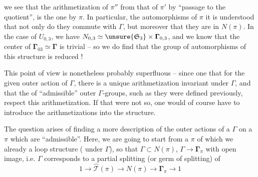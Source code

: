
we see that the arithmetization of $\pi''$  from that of $\pi'$ by ``passage to the quotient'', is the one  by $\pi$.  In particular,  the automorphisms of $\pi$ it is understood that  not only do they commute with $\Gamma$, but moreover that they are in $N(\pi)$.  In the case of $U_{0,3}$, we have $N_{0,3}\simeq\unsure{\mathfrak S_3}\times\boldsymbol{\Gamma}_{0,3}$, and we know that the center of $\boldsymbol{\Gamma}_{03}\simeq\boldsymbol{\Gamma}$ is trivial -- so we do find that the group of automorphisms of this structure is reduced   !

This point of view is nonetheless probably superfluous -- since one  that for the given outer action of $\Gamma$, there is a unique arithmetization invariant under $\Gamma$, and that the   of ``admissible'' outer $\Gamma$-groups, such as they were defined previously,  respect this arithmetization. If that were not so, one would of course have to introduce the arithmetizations into the structure.




The question arises of finding a more   description of the outer actions of a $\Gamma$ on a $\pi$ which are ``admissible''.  Here, we are going to start from a $\pi$ of which we already  a loop structure  ( under $\Gamma$), so  that $\Gamma\subset N(\pi)$, $\Gamma\longrightarrow\boldsymbol{\Gamma}_\pi$  with open image,  i.e. $\Gamma$ corresponds to a partial splitting (or germ of splitting) of 
\[
1\longrightarrow\widehat{\mathcal T}(\pi)\longrightarrow N(\pi)\longrightarrow\boldsymbol{\Gamma}_\pi\longrightarrow1
\]

